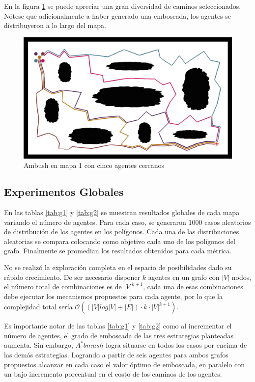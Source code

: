 \documentclass{egpubl}
\newcommand{\bigO}{\mathcal{O}}
\begin{document}
En la figura \ref{fig:ambush2} se puede apreciar una gran
diversidad de caminos seleccionados. Nótese que adicionalmente
a haber generado una emboscada, los agentes se distribuyeron a
lo largo del mapa.

\begin{figure}[htb]
	\begin{center}
		\includegraphics[scale=0.17]{ambush2.jpg}
	\end{center}
	\caption{\label{fig:ambush2}
	     Ambush en mapa 1 con cinco agentes cercanos}
\end{figure}

\subsection{Experimentos Globales}
\label{sec:Globales}

En las tablas \ref{tab:g1} y \ref{tab:g2} se muestran
resultados globales de cada mapa variando el número de
agentes. Para cada caso, se generaron 1000 casos aleatorios
de distribución de los agentes en los polígonos. Cada una de
las distribuciones aleatorias se compara colocando como objetivo
cada uno de los polígonos del grafo. Finalmente se promedian
los resultados obtenidos para cada métrica.

No se realizó la exploración
completa en el espacio de posibilidades dado su rápido crecimiento.
De ser necesario disponer $k$ agentes en un grafo con $|V|$ nodos,
el número total de combinaciones es de $|V|^{k+1}$, cada una de esas
combinaciones debe ejecutar los mecanismos propuestos para cada
agente, por lo que la complejidad total sería
$\bigO( (|V|log|V| + |E|)\cdot k \cdot |V|^{k+1} )$.




Es importante notar de las tablas \ref{tab:g1} y
\ref{tab:g2} como al incrementar el número de agentes,
el grado de emboscada de las tres estrategias planteadas
aumenta. Sin embargo, $A^*bmush$ logra situarse
en todos los casos por encima de las demás estrategias.
Logrando a partir de seis agentes para ambos grafos
propuestos alcanzar en cada caso el valor óptimo de
emboscada, en paralelo con un bajo incremento porcentual
en el costo de los caminos de los agentes.
\end{document}
